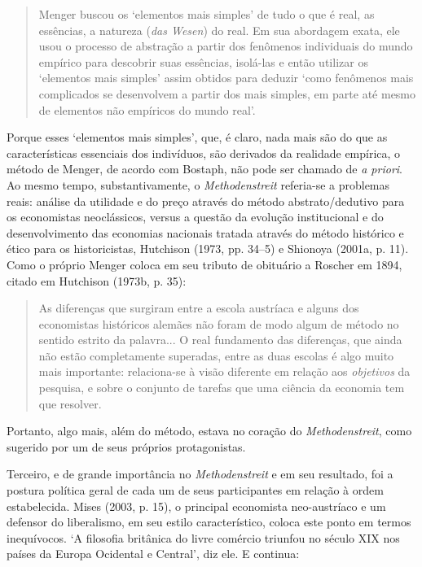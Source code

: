 \documentclass[12pt]{article}
\begin{document}
\begin{quote}
Menger buscou os ‘elementos mais simples’ de tudo o que é real, as essências, a natureza (\textit{das Wesen}) do real. Em sua abordagem exata, ele usou o processo de abstração a partir dos fenômenos individuais do mundo empírico para descobrir suas essências, isolá-las e então utilizar os ‘elementos mais simples’ assim obtidos para deduzir ‘como fenômenos mais complicados se desenvolvem a partir dos mais simples, em parte até mesmo de elementos não empíricos do mundo real’.
\end{quote}

Porque esses ‘elementos mais simples’, que, é claro, nada mais são do que as características essenciais dos indivíduos, são derivados da realidade empírica, o método de Menger, de acordo com Bostaph, não pode ser chamado de \textit{a priori}. Ao mesmo tempo, substantivamente, o \textit{Methodenstreit} referia-se a problemas reais: análise da utilidade e do preço através do método abstrato/dedutivo para os economistas neoclássicos, versus a questão da evolução institucional e do desenvolvimento das economias nacionais tratada através do método histórico e ético para os historicistas, Hutchison (1973, pp. 34–5) e Shionoya (2001a, p. 11). Como o próprio Menger coloca em seu tributo de obituário a Roscher em 1894, citado em Hutchison (1973b, p. 35):

\begin{quote}
As diferenças que surgiram entre a escola austríaca e alguns dos economistas históricos alemães não foram de modo algum de método no sentido estrito da palavra... O real fundamento das diferenças, que ainda não estão completamente superadas, entre as duas escolas é algo muito mais importante: relaciona-se à visão diferente em relação aos \textit{objetivos} da pesquisa, e sobre o conjunto de tarefas que uma ciência da economia tem que resolver.
\end{quote}

Portanto, algo mais, além do método, estava no coração do \textit{Methodenstreit}, como sugerido por um de seus próprios protagonistas.

Terceiro, e de grande importância no \textit{Methodenstreit} e em seu resultado, foi a postura política geral de cada um de seus participantes em relação à ordem estabelecida. Mises (2003, p. 15), o principal economista neo-austríaco e um defensor do liberalismo, em seu estilo característico, coloca este ponto em termos inequívocos. ‘A filosofia britânica do livre comércio triunfou no século XIX nos países da Europa Ocidental e Central’, diz ele. E continua:
\end{document}
